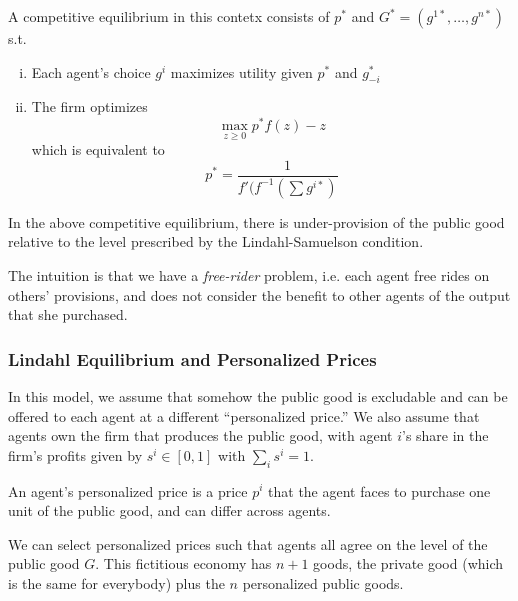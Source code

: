 \begin{definition}
  A competitive equilibrium in this contetx consists of $p^*$ and $G^*
  = (g^{1*}, \dots, g^{n*})$ s.t.
  \begin{enumerate}[(i)]
  \item Each agent's choice $g^i$ maximizes utility given $p^*$ and
    $g^*_{-i}$
  \item The firm optimizes
    \[
    \max_{z \geq 0} p^* f(z) - z
    \]
    which is equivalent to
    \[
    p^* = \frac{1}{f'(f^{-1}(\sum g^{i*})}
    \]
  \end{enumerate}

\end{definition}


\begin{prop}
  In the above competitive equilibrium, there is under-provision of
  the public good relative to the level prescribed by the Lindahl-Samuelson
  condition.
\end{prop}

The intuition is that we have a \textit{free-rider} problem, i.e. each
agent free rides on others' provisions, and does not consider the
benefit to other agents of the output that she purchased.

\subsubsection{Lindahl Equilibrium and Personalized Prices}

In this model, we assume that somehow the public good is excludable
and can be offered to each agent at a different ``personalized
price.'' We also assume that agents own the firm that produces the
public good, with agent $i$'s share in the firm's profits given by
$s^i \in [0,1]$ with $\sum_i s^i = 1$.

\begin{definition}
  An agent's personalized price is a price $p^i$ that the agent faces
  to purchase one unit of the public good, and can differ across
  agents.
\end{definition}

We can select personalized prices such that agents all agree on the
level of the public good $G$. This fictitious economy has $n+1$ goods,
the private good (which is the same for everybody) plus the $n$
personalized public goods.


